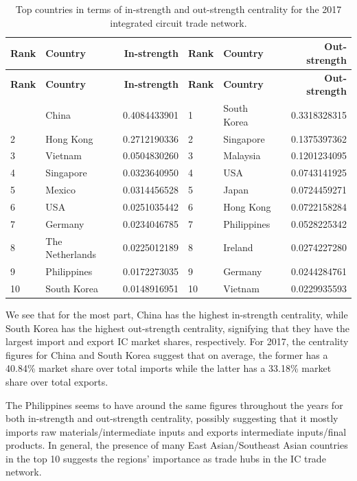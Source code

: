\documentclass[12pt,letterpaper]{report}
\begin{document}
			\begin{longtable}{|l|l|r|l|l|r|}
				\caption{Top countries in terms of in-strength and out-strength centrality for the 2017 integrated circuit trade network. \label{tab:tab02TopStrength}} \\
				\hline
				\textbf{\small Rank} & \textbf{\small Country} & \textbf{\small In-strength} & \textbf{\small Rank} &
				\textbf{\small Country} & \textbf{\small Out-strength} \\ 
				\hline
				\endfirsthead
				\hline
				\textbf{\small Rank} & \textbf{\small Country} & \textbf{\small In-strength} & \textbf{\small Rank} &
				\textbf{\small Country} & \textbf{\small Out-strength} \\ 
				\hline
				\endhead
				\hline
				\endfoot
				1 & China & 0.4084433901 & 1 & South Korea & 0.3318328315 \\
				2 & Hong Kong & 0.2712190336 & 2 & Singapore & 0.1375397362 \\
				3 & Vietnam & 0.0504830260 & 3 & Malaysia & 0.1201234095 \\
				4 & Singapore & 0.0323640950 & 4 & USA & 0.0743141925 \\
				5 & Mexico & 0.0314456528 & 5 & Japan & 0.0724459271 \\
				6 & USA & 0.0251035442 & 6 & Hong Kong & 0.0722158284 \\
				7 & Germany & 0.0234046785 & 7 & Philippines & 0.0528225342 \\
				8 & The Netherlands & 0.0225012189 & 8 & Ireland & 0.0274227280 \\
				9 & Philippines & 0.0172273035 & 9 & Germany & 0.0244284761 \\
				10 & South Korea & 0.0148916951 & 10 & Vietnam & 0.0229935593 \\
			\end{longtable}
			
			We see that for the most part, China has the highest in-strength centrality, while South Korea has the highest out-strength centrality, signifying that they have the largest import and export IC market shares, respectively. For 2017, the centrality figures for China and South Korea suggest that on average, the former has a 40.84\% market share over total imports while the latter has a 33.18\% market share over total exports.
			
			The Philippines seems to have around the same figures throughout the years for both in-strength and out-strength centrality, possibly suggesting that it mostly imports raw materials/intermediate inputs and exports intermediate inputs/final products. In general, the presence of many East Asian/Southeast Asian countries in the top 10 suggests the regions' importance as trade hubs in the IC trade network.
			
\end{document}
